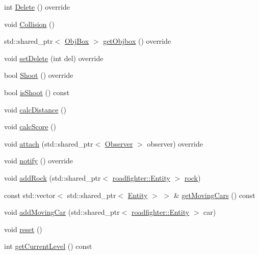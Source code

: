 \begin{DoxyCompactItemize}
\item 
int \hyperlink{classroadfighter_1_1World_a2db677b750afc0bf4f706f4cd930cb02}{Delete} () override
\item 
void \hyperlink{classroadfighter_1_1World_aac79d4ca8afdfe002f050f2db4fc2de5}{Collision} ()
\item 
std\+::shared\+\_\+ptr$<$ \hyperlink{structObjBox}{Obj\+Box} $>$ \hyperlink{classroadfighter_1_1World_a8825a89883229773abb09bb05ee89714}{get\+Objbox} () override
\item 
void \hyperlink{classroadfighter_1_1World_a78c860f6700cd7f8e47994c02e7fd181}{set\+Delete} (int del) override
\item 
bool \hyperlink{classroadfighter_1_1World_ab168eec31ad01a882254c5522b354d22}{Shoot} () override
\item 
bool \hyperlink{classroadfighter_1_1World_aa2e7026dfcb854af9484aad37ad4009d}{is\+Shoot} () const
\item 
void \hyperlink{classroadfighter_1_1World_a3c7e82a028d7dde78186c404c3a728b9}{calc\+Distance} ()
\item 
void \hyperlink{classroadfighter_1_1World_ad0e521ec14a1ddfacadd5c0b68908a00}{calc\+Score} ()
\item 
void \hyperlink{classroadfighter_1_1World_aae11d52bce048722267d7d0515c69985}{attach} (std\+::shared\+\_\+ptr$<$ \hyperlink{classObserver}{Observer} $>$ observer) override
\item 
void \hyperlink{classroadfighter_1_1World_ad2edbd8e41dfbc65c99500512f954940}{notify} () override
\item 
void \hyperlink{classroadfighter_1_1World_a7c36c25f62dcb8869f97448f7382d2df}{add\+Rock} (std\+::shared\+\_\+ptr$<$ \hyperlink{classroadfighter_1_1Entity}{roadfighter\+::\+Entity} $>$ \hyperlink{classroadfighter_1_1World_a141a64ca5d10b4cc1fcb0a055b4a1fd4}{rock})
\item 
const std\+::vector$<$ std\+::shared\+\_\+ptr$<$ \hyperlink{classroadfighter_1_1Entity}{Entity} $>$ $>$ \& \hyperlink{classroadfighter_1_1World_adc2a97d01fcad3d6a4857d886e8a10e4}{get\+Moving\+Cars} () const
\item 
void \hyperlink{classroadfighter_1_1World_a37c625e97a3de066ca8d2c7fced431a9}{add\+Moving\+Car} (std\+::shared\+\_\+ptr$<$ \hyperlink{classroadfighter_1_1Entity}{roadfighter\+::\+Entity} $>$ car)
\item 
void \hyperlink{classroadfighter_1_1World_a39fc556595c7fc3e3384299f11289c9c}{reset} ()
\item 
int \hyperlink{classroadfighter_1_1World_add95f57bb6322aab8a8e8c3ec2888a99}{get\+Current\+Level} () const

\end{DoxyCompactItemize}
